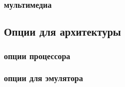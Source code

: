 {\subsubsection{мультимедиа}



\subsection{Опции для архитектуры }



\subsubsection{опции процессора }



\subsubsection{опции для эмулятора }




}{}
